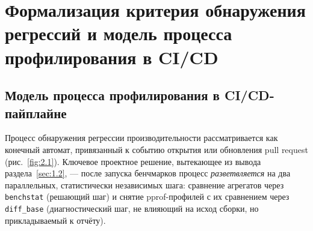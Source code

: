 \section{Формализация критерия обнаружения регрессий и модель процесса профилирования в CI/CD}
\label{sec:razdel2}

\subsection{Модель процесса профилирования в CI/CD-пайплайне}
\label{sec:2.1}

Процесс обнаружения регрессии производительности рассматривается как
конечный автомат, привязанный к событию открытия или обновления pull
request (рис.~\ref{fig:2.1}). Ключевое проектное решение, вытекающее из
вывода раздела~\ref{sec:1.2}, — после запуска бенчмарков процесс
\emph{разветвляется} на два параллельных, статистически независимых шага:
сравнение агрегатов через \texttt{benchstat} (решающий шаг) и снятие
pprof-профилей с их сравнением через \texttt{diff\_base} (диагностический
шаг, не влияющий на исход сборки, но прикладываемый к отчёту).

